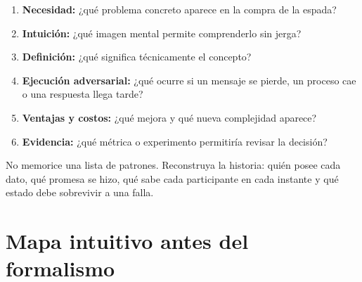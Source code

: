 \documentclass[variant=apuntes,cover=institutional,mode=screen]{ua-engineering-v6-article}
\begin{document}
\begin{enumerate}
\item \textbf{Necesidad:} ¿qué problema concreto aparece en la compra de la espada?
\item \textbf{Intuición:} ¿qué imagen mental permite comprenderlo sin jerga?
\item \textbf{Definición:} ¿qué significa técnicamente el concepto?
\item \textbf{Ejecución adversarial:} ¿qué ocurre si un mensaje se pierde, un proceso cae o una respuesta llega tarde?
\item \textbf{Ventajas y costos:} ¿qué mejora y qué nueva complejidad aparece?
\item \textbf{Evidencia:} ¿qué métrica o experimento permitiría revisar la decisión?
\end{enumerate}

No memorice una lista de patrones. Reconstruya la historia: quién posee cada dato, qué promesa se hizo, qué sabe cada participante en cada instante y qué estado debe sobrevivir a una falla.

\section{Mapa intuitivo antes del formalismo}
\end{document}
